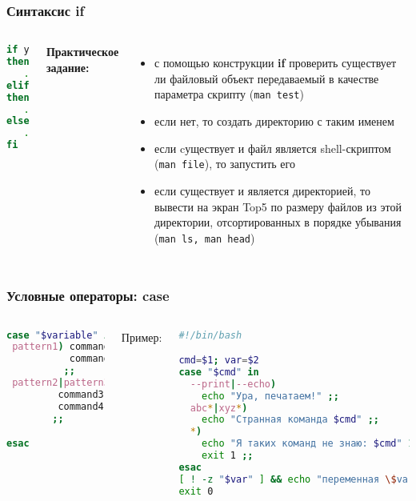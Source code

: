 
\begin{frame}[fragile]
\frametitle{Синтаксис {\bf if}}

	\begin{columns}
	
	\begin{lstlisting}[language=bash]
if условие1
then
   . . .
elif условие2
then
   . . .
else
   . . .
fi
\end{lstlisting}
	\pause
	{\bf Практическое задание:} \\
	\begin{itemize}

		\item с помощью конструкции {\bf if} проверить существует ли файловый объект передаваемый в качестве параметра скрипту ({\tt man test})
		\item если нет, то создать директорию с таким именем
		\item если cуществует и файл является shell-скриптом ({\tt man file}), то запустить его
		\item если существует и является директорией, то вывести на экран Top5 по размеру файлов из этой директории, 
		    отсортированных в порядке убывания ({\tt man ls, man head})
	\end{itemize}
	\end{columns}
\end{frame}

\begin{frame}[fragile]
\frametitle{Условные операторы: case}

	\small
	\begin{columns}
		\column{0.3\textwidth}

		\begin{lstlisting}[language=sh,frame=single]
case "$variable" in 
 pattern1) command1
           command2
          ;;
 pattern2|pattern3)
         command3
         command4
        ;;

esac
		\end{lstlisting}
		\pause

		\column{0.7\textwidth}
		{\normalsize Пример:}

		\begin{lstlisting}[language=sh]
#!/bin/bash

cmd=$1; var=$2
case "$cmd" in 
  --print|--echo)
    echo "Ура, печатаем!" ;;
  abc*|xyz*)
    echo "Странная команда $cmd" ;;
  *)
    echo "Я таких команд не знаю: $cmd" 1>&2
    exit 1 ;;
esac
[ ! -z "$var" ] && echo "переменная \$var=$var"
exit 0
		\end{lstlisting}


	\end{columns}
\end{frame}


